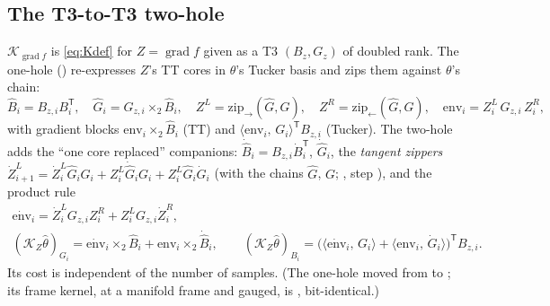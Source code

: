 \documentclass[11pt]{article}
\newcommand{\K}{\mathcal{K}}
\newcommand{\grad}{\operatorname{grad}}
\newcommand{\T}{\mathsf{T}}
\newcommand{\ip}[2]{\langle #1,\, #2\rangle}
\renewcommand{\th}{\theta}
\newcommand{\thh}{\hat\theta}
\theoremstyle{definition}
\theoremstyle{plain}
\begin{document}
\subsection{The T3-to-T3 two-hole}
\label{sec:t3t3}

$\K_{\grad f}$ is \eqref{eq:Kdef} for $Z=\grad f$ given as a T3 $(B_z,G_z)$ of doubled rank. The one-hole
() re-expresses $Z$'s TT cores in $\th$'s Tucker basis and zips them
against $\th$'s chain:
\begin{equation}
  \label{eq:t3t3}
  \hat B_i=B_{z,i}B_i^\T,\quad \hat G_i=G_{z,i}\times_2\hat B_i,\quad
  Z^L=\mathrm{zip}_\to(\hat G,G),\quad Z^R=\mathrm{zip}_\leftarrow(\hat G,G),\quad
  \mathrm{env}_i=Z^L_i\,G_{z,i}\,Z^R_i,
\end{equation}
with gradient blocks $\mathrm{env}_i\times_2\hat B_i$ (TT) and $\ip{\mathrm{env}_i}{G_i}^\T B_{z,i}$ (Tucker). The
two-hole adds the ``one core replaced'' companions: $\dot{\hat B}_i=B_{z,i}\dot B_i^\T$, $\dot{\hat G}_i$, the
\emph{tangent zippers} $\dot Z^{L}_{i+1}=\dot Z^L_i\hat G_iG_i+Z^L_i\dot{\hat G}_iG_i+Z^L_i\hat G_i\dot G_i$ (with the chains
$\hat G$, $G$; , step ), and the product rule
\begin{equation}
  \label{eq:t3t3dot}
  \begin{gathered}
  \dot{\mathrm{env}}_i=\dot Z^L_iG_{z,i}Z^R_i+Z^L_iG_{z,i}\dot Z^R_i,\\
  (\K_Z\thh)_{G_i}=\dot{\mathrm{env}}_i\times_2\hat B_i+\mathrm{env}_i\times_2\dot{\hat B}_i,\qquad
  (\K_Z\thh)_{B_i}=\big(\ip{\dot{\mathrm{env}}_i}{G_i}+\ip{\mathrm{env}_i}{\dot G_i}\big)^\T B_{z,i}.
  \end{gathered}
\end{equation}
Its cost is independent of the number of samples. (The one-hole moved from  to
; its frame kernel, at a manifold frame and gauged, is ,
bit-identical.)
\end{document}
